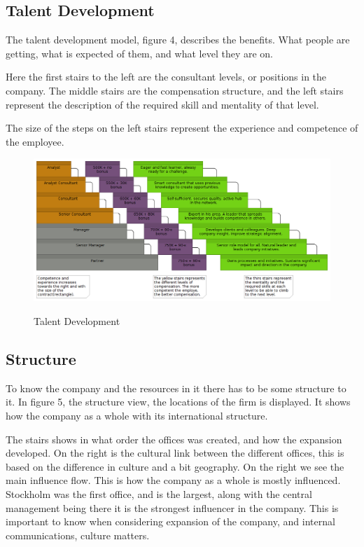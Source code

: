 \documentclass[12pt, a4paper]{article}
\begin{document}
\subsection{Talent Development}
The talent development model, figure 4, describes the benefits. What people are
getting, what is expected of them, and what level they are on.

Here the first stairs to the left are the consultant levels, or positions in
the company. The middle stairs are the compensation structure, and the left
stairs represent the description of the required skill and mentality of that
level.

The size of the steps on the left stairs represent the experience and
competence of the employee. 

\begin{figure}[htb]
    \centering
    \includegraphics[width=\textwidth]{TalentDevelopment} 
    \label{fig:TalentDevelopment}
    \caption{Talent Development}
\end{figure}

\subsection{Structure}
To know the company and the resources in it there has to be some structure to
it. In figure 5, the structure view, the locations of the firm is displayed. 
It shows how the company as a whole with its international structure. 

The stairs shows in what order the offices was created, and how the expansion
developed. On the right is the cultural link between the different offices,
this is based on the difference in culture and a bit geography. 
On the right we see the main influence flow. This is how the company as a whole
is mostly influenced. Stockholm was the first office, and is the largest, along
with the central management being there it is the strongest influencer in the
company. This is important to know when considering expansion of the company,
and internal communications, culture matters.   
\end{document}
